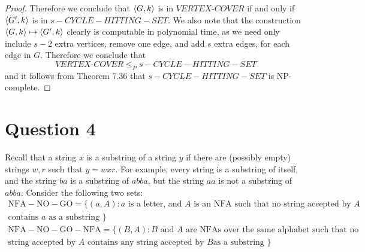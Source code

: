 \documentclass[a4paper,11pt]{article}
\newcommand{\tm}{\text{-}}
\numberwithin{equation}{section}
\begin{document}
\begin{proof}
		Therefore we conclude that $ \braket{G,k} $ is in $ VERTEX\tm COVER $ if and only if $ \braket{G',k} $ is in $ s-C Y C L E-H I T T I N G-S E T $. 
		We also note that the construction $ \braket{G,k}\mapsto \braket{G',k} $ clearly is computable in polynomial time, as we need only include $ s-2 $ extra vertices, remove one edge, and add $ s $ extra edges, for each edge in $ G $. Therefore we conclude that \begin{equation*}
			VERTEX\tm COVER\leq_P s-C Y C L E-H I T T I N G-S E T
		\end{equation*}
		and it follows from Theorem 7.36 that $ s-C Y C L E-H I T T I N G-S E T $ is NP-complete.
	\end{proof}
	
	\section*{Question 4}
		Recall that a string $x$ is a substring of a string $y$ if there are (possibly empty) strings $w, r$ such that $y=w x r$. For example, every string is a substring of itself, and the string $b a$ is a substring of $a b b a$, but the string $a a$ is not a substring of $a b b a$. Consider the following two sets:
		\begin{equation*}
			\begin{aligned}
			\mathrm{NFA-NO-GO}=\{(a, A): a\text{ is a letter, and
			$A$ is an NFA such that no string accepted by $A$}\\
		\text{contains $a$ as a substring }\}
			\end{aligned}
		\end{equation*}
		\begin{equation*}
			\begin{aligned}
			\mathrm{NFA-NO-GO-NFA} =\{(B, A): B\text{ and $A$ are NFAs over the same alphabet such that no}\\\text{
			string accepted by $A$ contains any string accepted by $B$
			as a substring }\}
			\end{aligned}
		\end{equation*}
\end{document}
